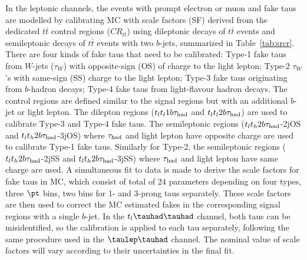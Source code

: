 In the leptonic channels, the events with prompt electron or muon and fake taus are modelled by calibrating MC with scale factors (SF)
derived from the dedicated $t\bar t$
control regions ($CR_{tt}$) using dileptonic decays of $t\bar t$ events and semileptonic decays of $t\bar t$ events with two
$b$-jets, summarized in Table~\ref{tab:srcr}. 	
There are four kinds of fake taus that need to be calibrated: Type-1 fake taus from $W$-jets ($\tau_{W}$)
with opposite-sign (OS) of charge to the light lepton;
Type-2 $\tau_{W}$'s with same-sign (SS) charge to the light lepton; Type-3 fake taus originating from $b$-hadron decays; Type-4 fake taus from light-flavour hadron decays.
The control regions are defined similar to the signal regions but with an additional $b$-jet or light lepton.
The dilepton regions ($t_lt_l1b\tau_\text{had}$ and $t_lt_l2b\tau_\text{had}$) are used to calibrate Type-3 and Type-4 fake taus. The semileptonic
regions ($t_lt_h2b\tau_\text{had}$-2jOS and $t_lt_h2b\tau_\text{had}$-3jOS) where $\tau_\text{had}$ and light lepton have opposite charge are used to calibrate Type-1 fake taus.
Similarly for Type-2, the semileptonic regions ($t_lt_h2b\tau_\text{had}$-2jSS and $t_lt_h2b\tau_\text{had}$-3jSS) where $\tau_\text{had}$ and light lepton have same charge are used.
A simultaneous fit to data is made to derive the scale factors for fake taus in MC, which consist of total of 24 parameters
depending on four types, three $\pt$ bins, two bins for 1- and 3-prong taus separately.
These scale factors are then used to correct the MC estimated fakes in the corresponding  signal regions with a single $b$-jet.
In the $t_l\thadhad$ channel, both taus can be misidentified, so the calibration is applied to each tau separately, following the same procedure used in the $\tlhad$ channel.
The nominal value of scale factors will vary according to their uncertainties in the final fit.

